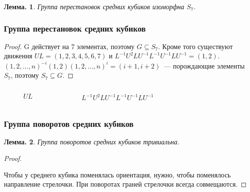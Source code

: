 \documentclass[utf8,russian]{beamer}
\newtheorem{ru_theo}{Лемма.}
\renewenvironment{theorem}{\begin{ru_theo}}{\end{ru_theo}}
\begin{document}
\begin{frame}
\begin{theorem}
	Группа перестановок средних кубиков изоморфна $S_7$.
\end{theorem}
\frametitle{Группа перестановок средних кубиков}
\begin{proof}
G действует на 7 элементах, поэтому $G\subseteq S_7$. Кроме того существуют движения $UL=(1,2,3,4,5,6,7)$ и $L^{-1}U^2LU^{-1}L^{-1}U^{-1}LU^{-1}=(1,2)$.
$(1,2,\ldots,n)^{-i}(1,2)(1,2,\ldots,n)^i=(i+1,i+2)$~--- порождающие элементы $S_7$, поэтому $S_7\subseteq G$.
\end{proof}
\vspace*{-5mm}
\begin{columns}[c]
\begin{figure}
\RubikCubeSolved
{}
\caption{$UL$}
\end{figure}
\begin{figure}
\RubikCubeSolved
{}
\caption{$L^{-1}U^2LU^{-1}L^{-1}U^{-1}LU^{-1}$}
\end{figure}
\end{columns}
\end{frame}


\begin{frame}
\frametitle{Группа поворотов средних кубиков}
\begin{theorem}
Группа поворотов средних кубиков тривиальна.
\end{theorem}
\begin{proof}
	\RubikCubeSolved
	\begin{figure}
	\end{figure}
	Чтобы у среднего кубика поменялась ориентация, нужно, чтобы поменялось направление стрелочки. При поворотах граней стрелочки всегда совмещаются.
\end{proof}
\end{frame}
\end{document}
